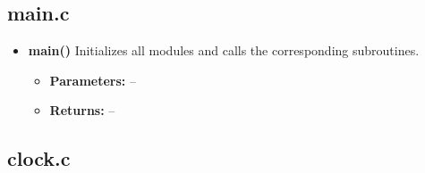 \documentclass[a4paper,12pt]{article}
\begin{document}
\subsection{main.c}
\begin{itemize}
    \item \textbf{main()}  
    Initializes all modules and calls the corresponding subroutines.  
    \begin{itemize}
        \item[] \textbf{Parameters:} --  
        \item[] \textbf{Returns:} --
    \end{itemize}
\end{itemize}

\subsection{clock.c}
\end{document}
